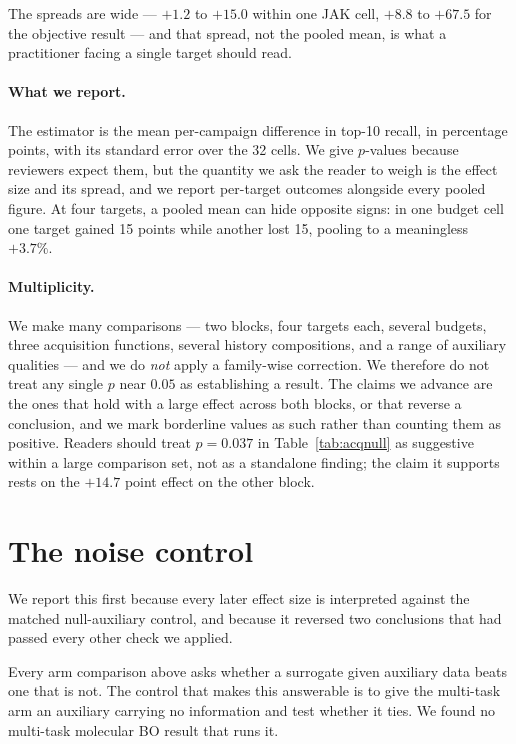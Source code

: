 \documentclass[11pt]{article}
\begin{document}
The spreads are wide --- $+1.2$ to $+15.0$ within one JAK cell, $+8.8$ to
$+67.5$ for the objective result --- and that spread, not the pooled mean, is
what a practitioner facing a single target should read.

\paragraph{What we report.} The estimator is the mean per-campaign difference in
top-10 recall, in percentage points, with its standard error over the 32 cells.
We give $p$-values because reviewers expect them, but the quantity we ask the
reader to weigh is the effect size and its spread, and we report per-target
outcomes alongside every pooled figure. At four targets, a pooled mean can hide
opposite signs: in one budget cell one target gained 15 points while another
lost 15, pooling to a meaningless $+3.7\%$.

\paragraph{Multiplicity.} We make many comparisons --- two blocks, four targets
each, several budgets, three acquisition functions, several history
compositions, and a range of auxiliary qualities --- and we do \emph{not} apply
a family-wise correction. We therefore do not treat any single $p$ near $0.05$
as establishing a result. The claims we advance are the ones that hold with a
large effect across both blocks, or that reverse a conclusion, and we mark
borderline values as such rather than counting them as positive. Readers should
treat $p = 0.037$ in Table~\ref{tab:acqnull} as suggestive within a large
comparison set, not as a standalone finding; the claim it supports rests on the
$+14.7$ point effect on the other block.

\section{The noise control}
\label{sec:null}

We report this first because every later effect size is interpreted against the matched null-auxiliary control, and
because it reversed two conclusions that had passed every other check we
applied.

Every arm comparison above asks whether a surrogate given auxiliary data beats
one that is not. The control that makes this answerable is to give the
multi-task arm an auxiliary carrying no information and test whether it ties. We
found no multi-task molecular BO result that runs it.
\end{document}

